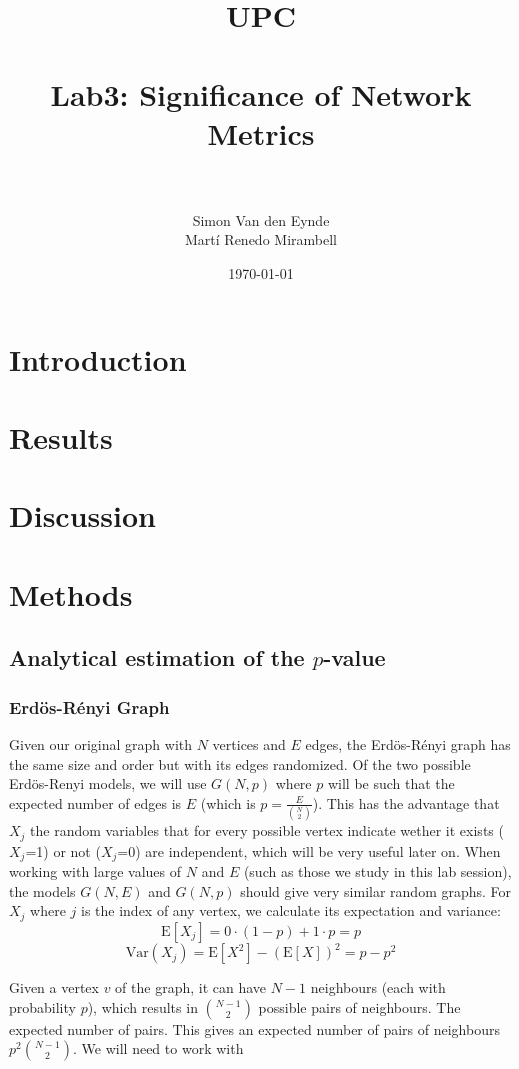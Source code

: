 \documentclass[paper=a4, fontsize=11pt]{scrartcl} %
\title{	
\normalfont \normalsize 
\textsc{UPC} \\ [25pt] %
\horrule{0.5pt} \\[0.4cm] %
\huge Lab3: Significance of Network Metrics \\ %
\horrule{2pt} \\[0.5cm] %
}
\author{Simon Van den Eynde\\ Martí Renedo Mirambell} %
\date{\normalsize\today} %
\newcommand{\E}{\mathrm{E}}
\newcommand{\Var}{\mathrm{Var}}
\begin{document}
\maketitle %



\section{Introduction}


\section{Results}

\section{Discussion}

\section{Methods}

\subsection{Analytical estimation of the $p$-value}
\subsubsection{Erdös-Rényi Graph}
Given our original graph with $N$ vertices and $E$ edges, the Erdös-Rényi graph has the same size and order but with its edges randomized.  Of the two possible Erdös-Renyi models, we will use $G(N,p)$ where $p$ will be such that the expected number of edges is $E$ (which is $p=\frac{E}{\binom{N}{2}}$). This has the advantage that $X_j$ the random variables that for every possible vertex indicate wether it exists ($X_j$=1) or not ($X_j$=0) are independent, which will be very useful later on. When working with large values of $N$ and $E$ (such as those we study in this lab session), the models $G(N,E)$ and $G(N,p)$ should give very similar random graphs. 
For $X_j$ where $j$ is the index of any vertex, we calculate its expectation and variance: 
$$\E[X_j]=0\cdot(1-p)+1\cdot p=p$$
$$\Var(X_j)=\E[X^2]-(\E[X])^2=p-p^2$$

Given a vertex $v$ of the graph, it can have $N-1$ neighbours (each with probability $p$), which results in $\binom{N-1}{2}$ possible pairs of neighbours. The expected number of pairs. This gives an expected number of pairs of neighbours $p^2\binom{N-1}{2}$. We will need to work with
\end{document}

